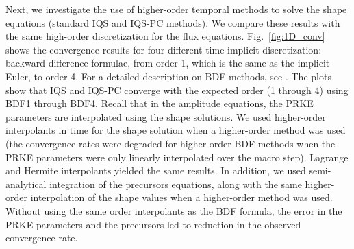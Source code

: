\documentclass{elsarticle}
\newcommand{\fig}[1]{Fig.~\ref{#1}}                      %
\newcommand{\iqspc}{IQS-PC\xspace}
\begin{document}
\clearpage
\newpage


Next, we investigate the use of higher-order temporal methods to solve the shape equations (standard IQS and \iqspc methods). We compare these results with the same high-order discretization for the flux equations. 
\fig{fig:1D_conv} shows the convergence results for four different time-implicit discretization: backward difference formulae, from order 1, which is the same as the implicit Euler, to order 4. For a detailed description on BDF methods, see \cite{Gear:2007}. The plots show that IQS and \iqspc converge with the expected order (1 through 4) using BDF1 through BDF4. Recall that in the amplitude equations, the PRKE parameters are interpolated using the shape solutions. We used higher-order interpolants in time for the shape solution when a higher-order method was used (the convergence rates were degraded for higher-order BDF methods when the PRKE parameters were only linearly interpolated over the macro step). Lagrange and Hermite interpolants yielded the same results. In addition, we used semi-analytical integration of the precursors equations, along with the same higher-order interpolation of the shape values when a higher-order method was used. Without using the same order interpolants as the BDF formula, the error in the PRKE parameters and the precursors led to reduction in the observed convergence rate.

\end{document}
